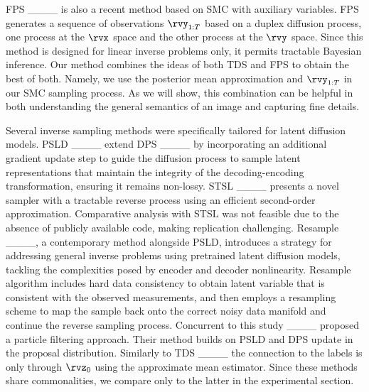 FPS ____ is also a recent method based on SMC with auxiliary variables. FPS generates a sequence of observations $\rvy_{1:T}$ based on a duplex diffusion process, one process at the $\rvx$ space and the other process at the $\rvy$ space. Since this method is designed for linear inverse problems only, it permits tractable Bayesian inference. Our method combines the ideas of both TDS and FPS to obtain the best of both. Namely, we use the posterior mean approximation and $\rvy_{1:T}$ in our SMC sampling process. As we will show, this combination can be helpful in both understanding the general semantics of an image and capturing fine details. 



Several inverse sampling methods were specifically tailored for latent diffusion models. 
PSLD ____ extend DPS ____ by incorporating an additional gradient update step to guide the diffusion process to sample latent representations that maintain the integrity of the decoding-encoding transformation, ensuring it remains non-lossy.
STSL ____ presents a novel sampler with a tractable reverse process using an efficient second-order approximation. 
Comparative analysis with STSL was not feasible due to the absence of publicly available code, making replication challenging.
Resample ____, a contemporary method alongside PSLD, introduces a strategy for addressing general inverse problems using pretrained latent diffusion models, tackling the complexities posed by encoder and decoder nonlinearity.
Resample algorithm includes hard data consistency to obtain latent variable that is consistent with the observed measurements, and then employs a resampling scheme to map the sample back onto the correct noisy data manifold and continue the reverse sampling process. 
Concurrent to this study ____ proposed a particle filtering approach. Their method builds on PSLD and DPS update in the proposal distribution. Similarly to TDS ____ the connection to the labels is only through $\rvz_0$ using the approximate mean estimator. Since these methods share commonalities, we compare only to the latter in the experimental section. 



